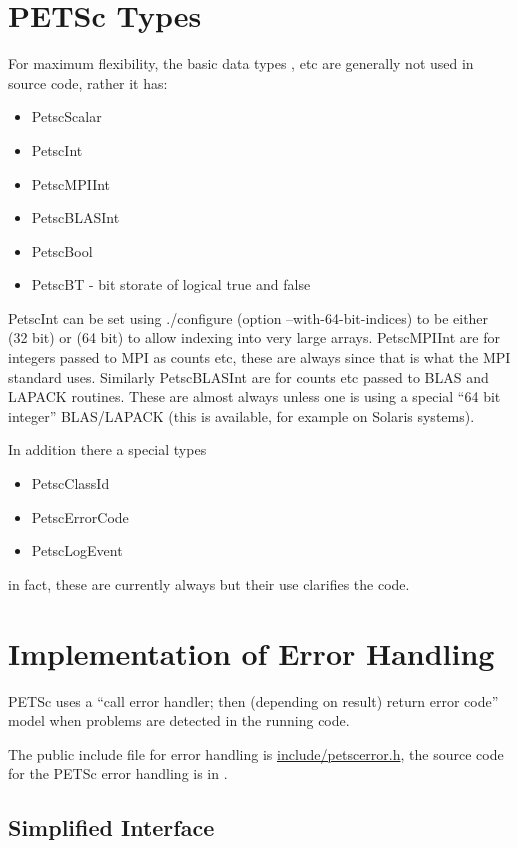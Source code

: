 \documentclass[twoside,12pt]{../sty/report_petsc}
\begin{document}
\section{PETSc Types}
For maximum flexibility, the basic data types ,  etc are
generally not used in source code, rather it has:
\begin{itemize}
  \item PetscScalar
  \item PetscInt
  \item PetscMPIInt
  \item PetscBLASInt
  \item PetscBool
  \item PetscBT  - bit storate of logical true and false
\end{itemize}
PetscInt can be set using ./configure (option --with-64-bit-indices) to be either  (32 bit) or 
(64 bit)
to allow indexing into very large arrays. PetscMPIInt are for integers passed to MPI
as counts etc, these are always  since that is what the MPI standard uses. Similarly
PetscBLASInt are for counts etc passed to BLAS and LAPACK routines. These are almost always
 unless one is using a special ``64 bit integer'' BLAS/LAPACK (this is available, for
example on Solaris systems).

In addition there a special types
\begin{itemize}
  \item PetscClassId
  \item PetscErrorCode
  \item PetscLogEvent
\end{itemize}
in fact, these are currently always  but their use clarifies the code.

\section{Implementation of Error Handling}

PETSc  uses a ``call error handler; then (depending on result) return
error code'' model when problems are detected in the running code.

The public include file for error handling is
 \href{http://www.mcs.anl.gov/petsc/petsc-master/include/petscerror.h.html}{include/petscerror.h}, the
source code for the PETSc error handling is in
.

\subsection{Simplified Interface}
\end{document}

